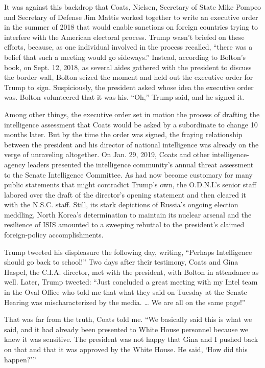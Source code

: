 It was against this backdrop that Coats, Nielsen, Secretary of State
Mike Pompeo and Secretary of Defense Jim Mattis worked together to write
an executive order in the summer of 2018 that would enable sanctions on
foreign countries trying to interfere with the American electoral
process. Trump wasn't briefed on these efforts, because, as one
individual involved in the process recalled, ``there was a belief that
such a meeting would go sideways.'' Instead, according to Bolton's book,
on Sept. 12, 2018, as several aides gathered with the president to
discuss the border wall, Bolton seized the moment and held out the
executive order for Trump to sign. Suspiciously, the president asked
whose idea the executive order was. Bolton volunteered that it was his.
``Oh,'' Trump said, and he signed it.

Among other things, the executive order set in motion the process of
drafting the intelligence assessment that Coats would be asked by a
subordinate to change 10 months later. But by the time the order was
signed, the fraying relationship between the president and his director
of national intelligence was already on the verge of unraveling
altogether. On Jan. 29, 2019, Coats and other intelligence-agency
leaders presented the intelligence community's annual threat assessment
to the Senate Intelligence Committee. As had now become customary for
many public statements that might contradict Trump's own, the O.D.N.I.'s
senior staff labored over the draft of the director's opening statement
and then cleared it with the N.S.C. staff. Still, its stark depictions
of Russia's ongoing election meddling, North Korea's determination to
maintain its nuclear arsenal and the resilience of ISIS amounted to a
sweeping rebuttal to the president's claimed foreign-policy
accomplishments.

Trump tweeted his displeasure the following day, writing, ``Perhaps
Intelligence should go back to school!'' Two days after their testimony,
Coats and Gina Haspel, the C.I.A. director, met with the president, with
Bolton in attendance as well. Later, Trump tweeted: ``Just concluded a
great meeting with my Intel team in the Oval Office who told me that
what they said on Tuesday at the Senate Hearing was mischaracterized by
the media. \ldots{} We are all on the same page!''

That was far from the truth, Coats told me. ``We basically said this is
what we said, and it had already been presented to White House personnel
because we knew it was sensitive. The president was not happy that Gina
and I pushed back on that and that it was approved by the White House.
He said, `How did this happen?'''

